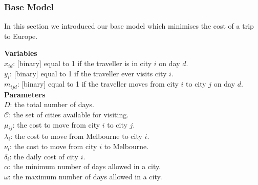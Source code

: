 \documentclass[12pt]{article}
\begin{document}
\subsubsection{Base Model}
In this section we introduced our base model which minimises the cost of a trip to Europe.

\noindent\textbf{Variables} \\
$x_{id}$: [binary] equal to 1 if the traveller is in city $i$ on day $d$. \\ 	%
$y_{i}$: [binary] equal to 1 if the traveller ever visits city $i$. \\		%
$m_{ijd}$: [binary] equal to 1 if the traveller moves from city $i$ to city $j$ on day $d$. \vspace{5mm}\\	%
\textbf{Parameters}\\
$D$: the total number of days. \\
$\mathcal{C}$: the set of cities available for visiting. \\
$\mu_{ij}$: the cost to move from city $i$ to city $j$. \\
$\lambda_{i}$: the cost to move from Melbourne to city $i$. \\
$\nu_{i}$: the cost to move from city $i$ to Melbourne. \\
$\delta_{i}$: the daily cost of city $i$. \\
$\alpha$: the minimum number of days allowed in a city. \\
$\omega$: the maximum number of days allowed in a city. \\
\end{document}

